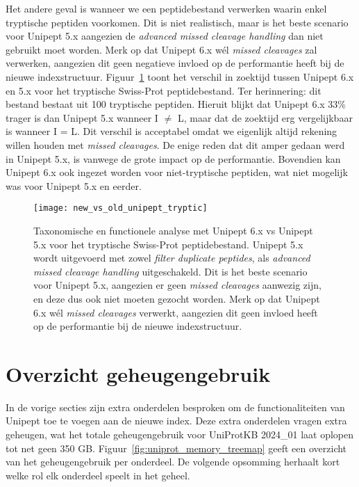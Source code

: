 Het andere geval is wanneer we een peptidebestand verwerken waarin enkel tryptische peptiden voorkomen.
Dit is niet realistisch, maar is het beste scenario voor Unipept 5.x aangezien de \textit{advanced missed cleavage handling} dan niet gebruikt moet worden.
Merk op dat Unipept 6.x wél \textit{missed cleavages} zal verwerken, aangezien dit geen negatieve invloed op de performantie heeft bij de nieuwe indexstructuur.
Figuur~\ref{fig:new_vs_old_unipept_tryptic} toont het verschil in zoektijd tussen Unipept 6.x en 5.x voor het tryptische Swiss-Prot peptidebestand.
Ter herinnering: dit bestand bestaat uit 100 tryptische peptiden.
Hieruit blijkt dat Unipept 6.x 33\% trager is dan Unipept 5.x wanneer I $\neq$ L, maar dat de zoektijd erg vergelijkbaar is wanneer I = L\@.
Dit verschil is acceptabel omdat we eigenlijk altijd rekening willen houden met \textit{missed cleavages}.
De enige reden dat dit amper gedaan werd in Unipept 5.x, is vanwege de grote impact op de performantie.
Bovendien kan Unipept 6.x ook ingezet worden voor niet-tryptische peptiden, wat niet mogelijk was voor Unipept 5.x en eerder.

\begin{figure}[h]
    \centering
    \texttt{[image: new\_vs\_old\_unipept\_tryptic]}
    \caption{Taxonomische en functionele analyse met Unipept 6.x vs Unipept 5.x voor het tryptische Swiss-Prot peptidebestand. Unipept 5.x wordt uitgevoerd met zowel \textit{filter duplicate peptides}, als \textit{advanced missed cleavage handling} uitgeschakeld. Dit is het beste scenario voor Unipept 5.x, aangezien er geen \textit{missed cleavages} aanwezig zijn, en deze dus ook niet moeten gezocht worden. Merk op dat Unipept 6.x wél \textit{missed cleavages} verwerkt, aangezien dit geen invloed heeft op de performantie bij de nieuwe indexstructuur.}
    \label{fig:new_vs_old_unipept_tryptic}
\end{figure}
\newpage
\section{Overzicht geheugengebruik}
In de vorige secties zijn extra onderdelen besproken om de functionaliteiten van Unipept toe te voegen aan de nieuwe index.
Deze extra onderdelen vragen extra geheugen, wat het totale geheugengebruik voor UniProtKB 2024\_01 laat oplopen tot net geen 350 GB\@.
Figuur~\ref{fig:uniprot_memory_treemap} geeft een overzicht van het geheugengebruik per onderdeel.
De volgende opsomming herhaalt kort welke rol elk onderdeel speelt in het geheel.

